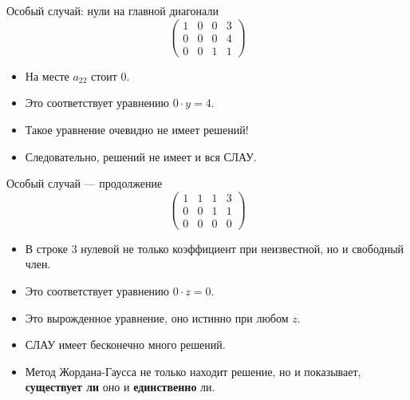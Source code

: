 \documentclass[12pt,aspectratio=169]{beamer}
\begin{document}
\begin{frame}{Особый случай: нули на главной диагонали}
    \[
    \left(\begin{array}{ccc|c}
        1 & 0 & 0 & 3 \\
        0 & 0 & 0 & 4 \\
        0 & 0 & 1 & 1
    \end{array}\right)
    \]
    \begin{itemize}
        \item<2-> На месте \(a_{22}\) стоит \alert{0}.
        \item<3-> Это соответствует уравнению $0\cdot y = 4$.
        \item<4-> Такое уравнение очевидно не имеет решений!
        \item<5-> Следовательно, решений не имеет и вся СЛАУ.
    \end{itemize}
\end{frame}

\begin{frame}{Особый случай --- продолжение}
    \[
    \left(\begin{array}{ccc|c}
        1 & 1 & 1 & 3 \\
        0 & 0 & 1 & 1 \\
        0 & 0 & 0 & 0
    \end{array}\right)
    \]
    \begin{itemize}
        \item<2-> В строке 3 нулевой не только коэффициент при неизвестной, но и свободный член.
        \item<3-> Это соответствует уравнению $0\cdot z = 0$.
        \item<4-> Это вырожденное уравнение, оно истинно при любом $z$.
        \item<5-> СЛАУ имеет бесконечно много решений.
        \item<6-> Метод Жордана-Гаусса не только находит решение, но и показывает, \textbf{существует ли} оно и \textbf{единственно} ли.
    \end{itemize}
\end{frame}
\end{document}

